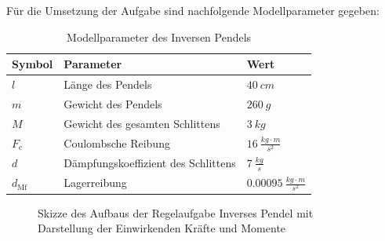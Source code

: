 \documentclass[
	pagesize,
	fontsize=12pt,
	paper=a4,
	oneside,
   reqno
]{scrartcl}
\begin{document}
Für die Umsetzung der Aufgabe sind nachfolgende Modellparameter gegeben:

\begin{table}[H]
    \centering
    \begin{tabular}{lll}
        \hline
        Symbol   & Parameter                           & Wert                                   \\ \hline
        $l$      & Länge des Pendels                   & $\SI{40}{cm}$                          \\
        $m$      & Gewicht des Pendels                 & $\SI{260}{g}$                          \\
        $M$      & Gewicht des gesamten Schlittens     & $\SI{3}{kg}$                           \\
        $F_{\mathrm{c}}$    & Coulombsche Reibung                 & $\SI{16}{\frac{kg \cdot m}{s^2}}$      \\
        $d$      & Dämpfungskoeffizient des Schlittens & $\SI{7}{\frac{kg}{s}}$                 \\
        $d_{\mathrm{Mf}}$ & Lagerreibung                        & $\SI{0.00095}{\frac{kg \cdot m}{s^2}}$ \\ \hline
    \end{tabular}
    \caption{Modellparameter des Inversen Pendels}
    \label{tab:my-table1}
\end{table}

\begin{figure}[H]
   \centering
   \caption[Skizze des Aufbaus der Regelaufgabe]{Skizze des Aufbaus der Regelaufgabe Inverses Pendel mit Darstellung der Einwirkenden Kräfte und Momente}
   \label{fig:Bild1}
\end{figure}
\end{document}
